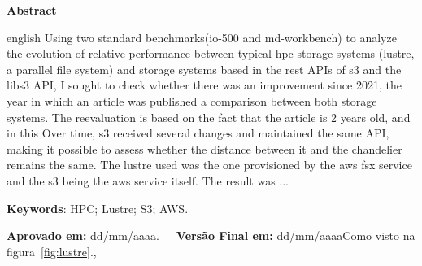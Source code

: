 \documentclass[article,a4paper,12pt,brazil,sumario=tradicional]{abntex2}
\begin{document}
\begin{center}
    \textbf{Abstract}
\end{center}

\vspace{-.3cm}
\begin{hyphenrules}{english}
\noindent Using two standard benchmarks(io-500 and md-workbench) to analyze the evolution of relative performance between
typical hpc storage systems (lustre, a parallel file system) and storage systems based
in the rest APIs of s3 and the libs3 API, I sought to check whether there was an improvement since 2021, the year in which an article was published
a comparison between both storage systems. The reevaluation is based on the fact that the article is 2 years old, and in this
Over time, s3 received several changes and maintained the same API, making it possible to assess whether the distance between it and the chandelier
remains the same. The lustre used was the one provisioned by the aws fsx service and the s3 being the aws service itself. The result was ...
\end{hyphenrules}
\vspace{.4cm}
 
\noindent \textbf{Keywords}: HPC; Lustre; S3; AWS.

\vspace{.4cm}

\noindent \textbf{Aprovado em:} dd/mm/aaaa.~~~\textbf{Versão Final em:} dd/mm/aaaaComo visto na figura~\ref{fig:lustre}., 
\end{document}
